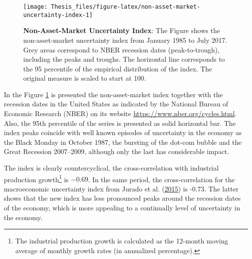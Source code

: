 \documentclass[12pt,twoside]{reedthesis}
\begin{document}
\begin{figure}

{\centering \texttt{[image: Thesis\_files/figure-latex/non-asset-market-uncertainty-index-1]} 

}

\caption[Non-Asset-Market Uncertainty Index]{\textbf{Non-Asset-Market Uncertainty Index}: The Figure shows the non-asset-market uncertainty index from January 1985 to July 2017. Grey areas correspond to NBER recession dates (peak-to-trough), including the peaks and troughs. The horizontal line corresponds to the 95 percentile of the empirical distribution of the index. The original measure is scaled to start at 100.}\label{fig:non-asset-market-uncertainty-index}
\end{figure}
In the Figure \ref{fig:non-asset-market-uncertainty-index} is presented the non-asset-market index together with the recession dates in the United States as indicated by the National Bureau of Economic Research (NBER) on its website \url{https://www.nber.org/cycles.html}. Also, the 95th percentile of the series is presented as solid horizontal bar. The index peaks coincide with well known episodes of uncertainty in the economy as the Black Monday in October 1987, the bursting of the dot-com bubble and the Great Recession 2007--2009, although only the last has considerable impact.

The index is clearly countercyclical, the cross-correlation with industrial production growth\footnote{The industrial production growth is calculated as the 12-month moving average of monthly growth rates (in annualized percentage).} is \(-0.69\). In the same period, the cross-correlation for the macroeconomic uncertainty index from Jurado et al. (\protect\hyperlink{ref-juraludvng:2015}{2015}) is -0.73. The latter shows that the new index has less pronounced peaks around the recession dates of the economy, which is more appealing to a continually level of uncertainty in the economy.
\end{document}
